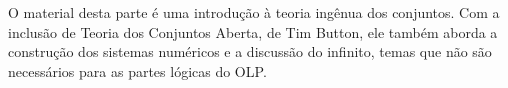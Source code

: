 \documentclass[../../include/open-logic-part]{subfiles}
\begin{document}

\begin{editorial}
  O material desta parte é uma introdução à teoria ingênua dos conjuntos.
  Com a inclusão de Teoria dos Conjuntos Aberta, de Tim Button, ele também aborda
  a construção dos sistemas numéricos e a discussão do infinito, temas que
  não são necessários para as partes lógicas do OLP.
\end{editorial}







\OLEndPartHook
\end{document}
